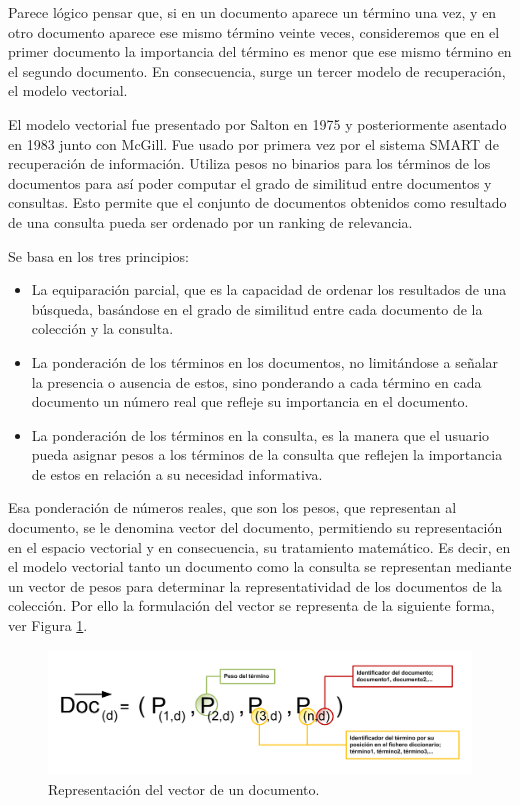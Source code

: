 \documentclass{article}
\begin{document}
Parece lógico pensar que, si en un documento aparece un término una vez, y en otro documento aparece ese mismo término veinte veces, consideremos que en el primer documento la importancia del término es menor que ese mismo término en el segundo documento. En consecuencia, surge un tercer modelo de recuperación, el modelo vectorial.

El modelo vectorial fue presentado por Salton en 1975 y posteriormente asentado en 1983 junto con McGill. Fue usado por primera vez por el sistema SMART de recuperación de información. Utiliza pesos no binarios para los términos de los documentos para así poder computar el grado de similitud entre documentos y consultas.  Esto permite que el conjunto de documentos obtenidos como resultado de una consulta pueda ser ordenado por un ranking de relevancia. 

Se basa en los tres principios:

\begin{itemize}
	\item La equiparación parcial, que es la capacidad de ordenar los resultados de una búsqueda, basándose en el grado de similitud entre cada documento de la colección y la consulta.
	\item La ponderación de los términos en los documentos, no limitándose a señalar la presencia o ausencia de estos, sino ponderando a cada término en cada documento un número real que refleje su importancia en el documento.
	\item La ponderación de los términos en la consulta, es la manera que el usuario pueda asignar pesos a los términos de la consulta que reflejen la importancia de estos en relación a su necesidad informativa.
\end{itemize}

Esa ponderación de números reales, que son los pesos, que representan al documento, se le denomina vector del documento, permitiendo su representación en el espacio vectorial y en consecuencia, su tratamiento matemático. Es decir, en el modelo vectorial tanto un documento como la consulta se representan mediante un vector de pesos para determinar la representatividad de los documentos de la colección. Por ello la formulación del vector se representa de la siguiente forma, ver Figura \ref{fig: Figure 6}.

\begin{figure}[h]
	\begin{center}
		\includegraphics*[scale=0.5]{formula_vector.png}
	\end{center}
	\caption{Representación del vector de un documento.}
	\label{fig: Figure 6}
\end{figure}
\end{document}
